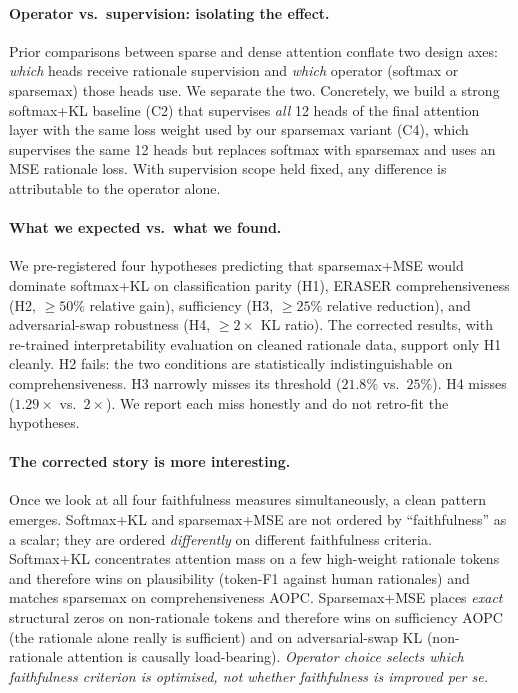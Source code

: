 \documentclass{article}
\begin{document}
\paragraph{Operator vs.\ supervision: isolating the effect.} Prior comparisons between
sparse and dense attention conflate two design axes: \emph{which} heads receive
rationale supervision and \emph{which} operator (softmax or sparsemax) those heads use.
We separate the two. Concretely, we build a strong softmax+KL baseline (C2) that
supervises \emph{all} 12 heads of the final attention layer with the same loss weight
used by our sparsemax variant (C4), which supervises the same 12 heads but replaces
softmax with sparsemax and uses an MSE rationale loss. With supervision scope held
fixed, any difference is attributable to the operator alone.

\paragraph{What we expected vs.\ what we found.} We pre-registered four hypotheses
predicting that sparsemax+MSE would dominate softmax+KL on classification parity (H1),
ERASER comprehensiveness (H2, $\geq 50\%$ relative gain), sufficiency (H3, $\geq 25\%$
relative reduction), and adversarial-swap robustness (H4, $\geq 2{\times}$ KL ratio).
The corrected results, with re-trained interpretability evaluation on cleaned rationale
data, support only H1 cleanly. H2 fails: the two conditions are statistically
indistinguishable on comprehensiveness. H3 narrowly misses its threshold ($21.8\%$ vs.\
$25\%$). H4 misses ($1.29{\times}$ vs.\ $2{\times}$). We report each miss honestly and
do not retro-fit the hypotheses.

\paragraph{The corrected story is more interesting.} Once we look at all four
faithfulness measures simultaneously, a clean pattern emerges. Softmax+KL and
sparsemax+MSE are not ordered by ``faithfulness'' as a scalar; they are ordered
\emph{differently} on different faithfulness criteria. Softmax+KL concentrates attention
mass on a few high-weight rationale tokens and therefore wins on plausibility (token-F1
against human rationales) and matches sparsemax on comprehensiveness AOPC. Sparsemax+MSE
places \emph{exact} structural zeros on non-rationale tokens and therefore wins on
sufficiency AOPC (the rationale alone really is sufficient) and on adversarial-swap KL
(non-rationale attention is causally load-bearing). \emph{Operator choice selects which
faithfulness criterion is optimised, not whether faithfulness is improved per se.}
\end{document}

